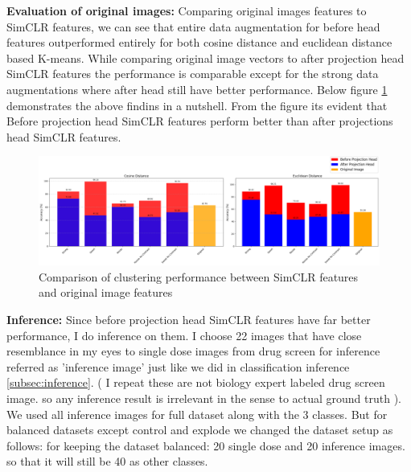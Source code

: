     \begin{table}[H]
        \centering
        \caption{Evaluation Results Using Different Distance Metrics for original images}
        \label{tab:distance_metrics}
    \end{table}
    
\textbf{Evaluation of original images:}
Comparing original images features to SimCLR features, we can see that entire data augmentation for  before head features outperformed entirely for both cosine distance and euclidean distance based K-means.
While comparing original image vectors to after projection head SimCLR features the performance is comparable except for the strong data augmentations where after head still have better performance. 
Below figure \ref{fig:cluster} demonstrates the above findins in a nutshell. From the figure its evident that Before projection head SimCLR features perform better than after projections head SimCLR features.

\begin{figure}[H]
    \centering
    \includegraphics[scale=0.37]{figures/cluster.png} 
    \caption{Comparison of clustering performance between SimCLR features and original image features}
    \label{fig:cluster}
\end{figure}

\textbf{Inference:}
Since before projection head SimCLR features have far better performance, I do  inference on them. I choose 22 images that have close resemblance in my eyes to single dose images from drug screen for inference referred as 'inference image' just like we did in classification inference \ref{subsec:inference}. ( I repeat these are not biology expert labeled drug screen image. so any inference result is irrelevant in the sense to actual ground truth ). We used all inference images for full dataset along with the 3 classes. But for balanced datasets except control and explode
 we changed the  dataset setup as follows: for keeping the dataset balanced: 20 single dose and 20 inference images. so that it will still be 40 as other classes.

